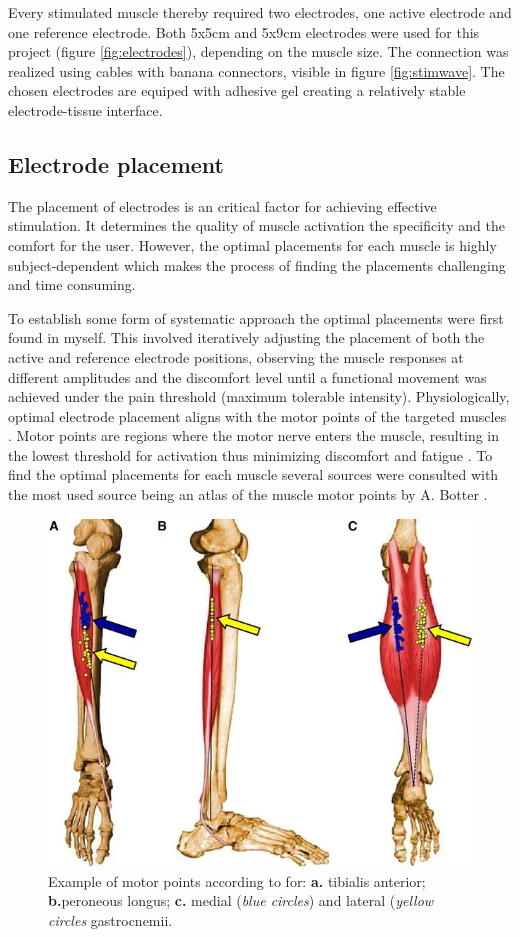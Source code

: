 Every stimulated muscle thereby required two electrodes, one active electrode and one reference electrode. Both 5x5cm and 5x9cm electrodes were used for this project (figure \ref{fig:electrodes}), depending on the muscle size. The connection was realized using cables with banana connectors, visible in figure \ref{fig:stimwave}. The chosen electrodes are equiped with adhesive gel creating a relatively stable electrode-tissue interface. 

\subsection{Electrode placement}
The placement of electrodes is an critical factor for achieving effective stimulation. It determines the quality of muscle activation the specificity and the comfort for the user. However, the optimal placements for each muscle is highly subject-dependent which makes the process of finding the placements challenging and time consuming.

To establish some form of systematic approach the optimal placements were first found in myself. This involved iteratively adjusting the placement of both the active and reference electrode positions, observing the muscle responses at different amplitudes and the discomfort level until a functional movement was achieved under the pain threshold (maximum tolerable intensity). Physiologically, optimal electrode placement aligns with the motor points of the targeted muscles . Motor points are regions where the motor nerve enters the muscle, resulting in the lowest threshold for activation thus minimizing discomfort and fatigue . To find the optimal placements for each muscle several sources were consulted with the most used source being an atlas of the muscle motor points by A. Botter \cite{botter_atlas_2011}. 

\begin{figure}
    \centering
    \includegraphics[width=0.5\linewidth]{images/motorpoints.png}
    \caption{Example of motor points according to \cite{botter_atlas_2011} for: \textbf{a.} tibialis anterior; \textbf{b.}peroneous longus; \textbf{c.} medial (\textit{blue circles}) and lateral (\textit{yellow circles} gastrocnemii. }
    \label{fig:motor-points}
\end{figure}

